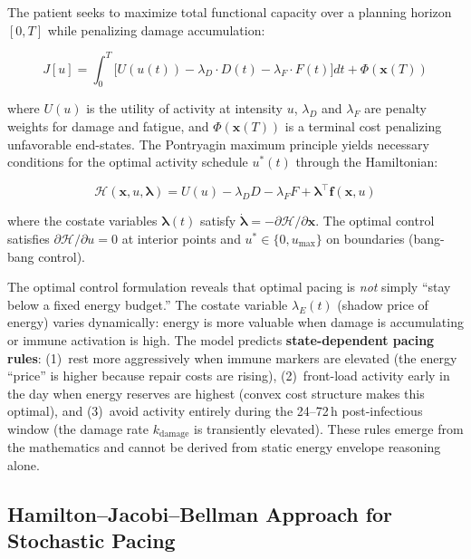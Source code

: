 The patient seeks to maximize total functional capacity over a planning horizon $[0, T]$ while penalizing damage accumulation:

\begin{equation}
\label{eq:pacing-objective}
J[u] = \int_0^{T} \Big[ U(u(t)) - \lambda_D \cdot D(t) - \lambda_F \cdot F(t) \Big] dt + \Phi(\mathbf{x}(T))
\end{equation}

where $U(u)$ is the utility of activity at intensity $u$, $\lambda_D$ and $\lambda_F$ are penalty weights for damage and fatigue, and $\Phi(\mathbf{x}(T))$ is a terminal cost penalizing unfavorable end-states. The Pontryagin maximum principle yields necessary conditions for the optimal activity schedule $u^*(t)$ through the Hamiltonian:

\begin{equation}
\label{eq:pacing-hamiltonian}
\mathcal{H}(\mathbf{x}, u, \boldsymbol{\lambda}) = U(u) - \lambda_D D - \lambda_F F + \boldsymbol{\lambda}^\top \mathbf{f}(\mathbf{x}, u)
\end{equation}

where the costate variables $\boldsymbol{\lambda}(t)$ satisfy $\dot{\boldsymbol{\lambda}} = -\partial \mathcal{H}/\partial \mathbf{x}$. The optimal control satisfies $\partial \mathcal{H}/\partial u = 0$ at interior points and $u^* \in \{0, u_{\max}\}$ on boundaries (bang-bang control).

\begin{modelunique}
The optimal control formulation reveals that optimal pacing is \emph{not} simply ``stay below a fixed energy budget.'' The costate variable $\lambda_E(t)$ (shadow price of energy) varies dynamically: energy is more valuable when damage is accumulating or immune activation is high. The model predicts \textbf{state-dependent pacing rules}: (1)~rest more aggressively when immune markers are elevated (the energy ``price'' is higher because repair costs are rising), (2)~front-load activity early in the day when energy reserves are highest (convex cost structure makes this optimal), and (3)~avoid activity entirely during the 24--72\,h post-infectious window (the damage rate $k_{\text{damage}}$ is transiently elevated). These rules emerge from the mathematics and cannot be derived from static energy envelope reasoning alone.
\end{modelunique}

\subsection{Hamilton--Jacobi--Bellman Approach for Stochastic Pacing}

